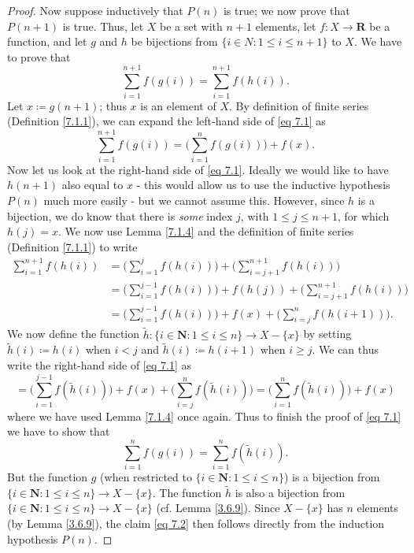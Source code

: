 \begin{proof}
Now suppose inductively that \(P(n)\) is true;
we now prove that \(P(n + 1)\) is true.
Thus, let \(X\) be a set with \(n + 1\) elements, let \(f : X \to \mathbf{R}\) be a function, and let \(g\) and \(h\) be bijections from \(\{i \in N : 1 \leq i \leq n + 1\}\) to \(X\).
We have to prove that
\[
    \sum_{i = 1}^{n + 1} f(g(i)) = \sum_{i = 1}^{n + 1} f(h(i)). \tag{7.1}\label{eq 7.1}
\]
Let \(x \coloneqq g(n + 1)\);
thus \(x\) is an element of \(X\).
By definition of finite series (Definition \ref{7.1.1}), we can expand the left-hand side of \eqref{eq 7.1} as
\[
    \sum_{i = 1}^{n + 1} f(g(i)) = \Bigg(\sum_{i = 1}^n f(g(i))\Bigg) + f(x).
\]
Now let us look at the right-hand side of \eqref{eq 7.1}.
Ideally we would like to have \(h(n + 1)\) also equal to \(x\)
- this would allow us to use the inductive hypothesis \(P(n)\) much more easily
- but we cannot assume this.
However, since \(h\) is a bijection, we do know that there is \emph{some} index \(j\), with \(1 \leq j \leq n + 1\), for which \(h(j) = x\).
We now use Lemma \ref{7.1.4} and the definition of finite series (Definition \ref{7.1.1}) to write
\begin{align*}
\sum_{i = 1}^{n + 1} f(h(i)) &= \Bigg(\sum_{i = 1}^j f(h(i))\Bigg) + \Bigg(\sum_{i = j + 1}^{n + 1} f(h(i))\Bigg) \\
&= \Bigg(\sum_{i = 1}^{j - 1} f(h(i))\Bigg) + f(h(j)) + \Bigg(\sum_{i = j + 1}^{n + 1} f(h(i))\Bigg) \\
&= \Bigg(\sum_{i = 1}^{j - 1} f(h(i))\Bigg) + f(x) + \Bigg(\sum_{i = j}^n f(h(i + 1))\Bigg).
\end{align*}
We now define the function \(\tilde{h} : \{i \in \mathbf{N} : 1 \leq i \leq n\} \to X - \{x\}\) by setting \(\tilde{h}(i) \coloneqq h(i)\) when \(i < j\) and \(\tilde{h}(i) \coloneqq h(i + 1)\) when \(i \geq j\).
We can thus write the right-hand side of \eqref{eq 7.1} as
\[
    = \Bigg(\sum_{i = 1}^{j - 1} f(\tilde{h}(i))\Bigg) + f(x) + \Bigg(\sum_{i = j}^n f(\tilde{h}(i))\Bigg) = \Bigg(\sum_{i = 1}^n f(\tilde{h}(i))\Bigg) + f(x)
\]
where we have used Lemma \ref{7.1.4} once again.
Thus to finish the proof of \eqref{eq 7.1} we have to show that
\[
    \sum_{i = 1}^n f(g(i)) = \sum_{i = 1}^n f(\tilde{h}(i)). \tag{7.2}\label{eq 7.2}
\]
But the function \(g\) (when restricted to \(\{i \in \mathbf{N} : 1 \leq i \leq n\}\)) is a bijection from \(\{i \in \mathbf{N} : 1 \leq i \leq n\} \to X - \{x\}\).
The function \(\tilde{h}\) is also a bijection from \(\{i \in \mathbf{N} : 1 \leq i \leq n\} \to X - \{x\}\) (cf. Lemma \ref{3.6.9}).
Since \(X - \{x\}\) has \(n\) elements (by Lemma \ref{3.6.9}), the claim \eqref{eq 7.2} then follows directly from the induction hypothesis \(P(n)\).
\end{proof}


